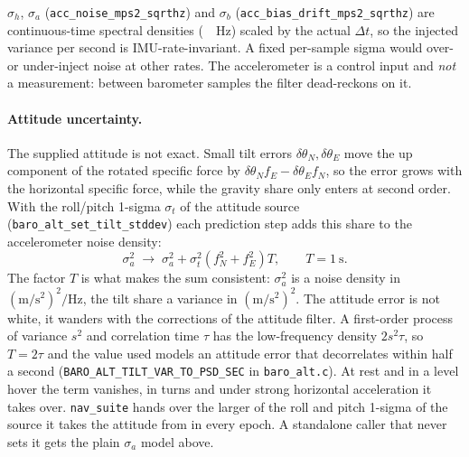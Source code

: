 \documentclass[11pt,a4paper]{article}
\newcommand{\dt}{\Delta t}
\newcommand{\code}[1]{\texttt{#1}}
\begin{document}
$\sigma_h$, $\sigma_a$ (\code{acc\_\allowbreak{}noise\_\allowbreak{}mps2\_\allowbreak{}sqrthz}) and $\sigma_b$
(\code{acc\_\allowbreak{}bias\_\allowbreak{}drift\_\allowbreak{}mps2\_\allowbreak{}sqrthz}) are continuous-time spectral densities
(\si{\per\sqrt\hertz}) scaled by the actual $\dt$, so the injected variance per
second is IMU-rate-invariant. A fixed per-sample sigma would over- or
under-inject noise at other rates. The accelerometer is a control input and
\emph{not} a measurement: between barometer samples the filter dead-reckons on
it.

\paragraph{Attitude uncertainty.} The supplied attitude is not exact. Small
tilt errors $\delta\theta_N, \delta\theta_E$ move the up component of the rotated
specific force by $\delta\theta_N f_E - \delta\theta_E f_N$, so the error grows
with the horizontal specific force, while the gravity share only enters at
second order. With the roll/pitch 1-sigma $\sigma_t$ of the attitude source
(\code{baro\_\allowbreak{}alt\_\allowbreak{}set\_\allowbreak{}tilt\_\allowbreak{}stddev}) each prediction
step adds this share to the accelerometer noise density:
\begin{equation}
  \sigma_a^2 \;\rightarrow\; \sigma_a^2 + \sigma_t^2\left(f_N^2 + f_E^2\right) T,
  \qquad T = \SI{1}{\second}.
\end{equation}
The factor $T$ is what makes the sum consistent: $\sigma_a^2$ is a noise
density in $(\si{\metre\per\second\squared})^2/\si{\hertz}$, the tilt share a
variance in $(\si{\metre\per\second\squared})^2$. The attitude error is not
white, it wanders with the corrections of the attitude filter. A first-order
process of variance $s^2$ and correlation time $\tau$ has the low-frequency
density $2 s^2 \tau$, so $T = 2\tau$ and the value used models an attitude
error that decorrelates within half a second
(\code{BARO\_ALT\_TILT\_VAR\_TO\_PSD\_SEC} in \code{baro\_alt.c}).
At rest and in a level hover the term vanishes, in turns and under strong
horizontal acceleration it takes over. \code{nav\_\allowbreak{}suite} hands over the
larger of the roll and pitch 1-sigma of the source it takes the attitude from
in every epoch. A standalone caller that never sets it gets the plain
$\sigma_a$ model above.
\end{document}
